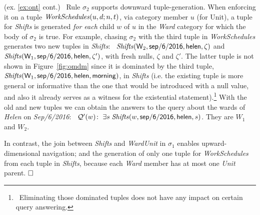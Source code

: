 \documentclass[format=acmsmall, review=false, screen=true]{acmart}
\newcommand{\ignore}[1]{}
\newcommand{\cq}{CQ}
\newcommand{\boxtheorem}{\ensuremath{\hfill \Box}}
\newcommand{\mc}[1]{\mathcal{ #1}}
\newcommand{\nit}[1]{{\it #1}}
\newcommand{\red}[1]{{#1}}
\newcommand{\blue}[1]{{#1}}
\newcommand{\comlb}[1]{{\vspace{2mm}\noindent \bf \blue{COMM(LEO):}}~ #1 \hfill {\bf
    END.}\\}
\newcommand{\commos}[1]{{\vspace{2mm}\noindent \bf \blue{COMM(MOSTAFA):}}~ #1 \hfill {\bf
    END.}\\}
\begin{document}
\begin{example} \label{ex:dn} (ex. \ref{ex:ont} cont.) \ Rule $\sigma_2$ supports downward tuple-generation. When enforcing it on a tuple ${\it WorkSchedules}(u,d;n,t)$, via category member $u$ (for Unit), a tuple for {\it Shifts} is generated {\em for each} child $w$ of $u$ in the \nit{Ward} category for which the body of $\sigma_2$ is true.
For example, chasing $\sigma_2$ with the third tuple in {\it WorkSchedules} generates two new tuples in \nit{Shifts}: \ ${\it Shifts}({\sf W}_2, {\sf sep/6/2016},{\sf helen},\zeta)$ and ${\it Shifts}({\sf W}_1, {\sf sep/6/2016},{\sf helen},\zeta')$, with fresh nulls, $\zeta$ and $\zeta'$. The latter tuple is not shown in Figure~\ref{fig:omdm} \red{since} it is dominated by the third tuple, ${\it Shifts}({\sf W}_1, {\sf sep/6/2016},{\sf helen},{\sf morning})$, in \nit{Shifts} \red{(i.e. the existing tuple is more general or informative than the one that would be introduced with a null value, and also it already serves as a witness for the existential statement).\footnote{\ \red{Eliminating those dominated tuples does not have any impact on certain query answering.}}} With the old and new tuples we can obtain the answers to the query about the wards of {\it Helen}  on \nit{Sep/6/2016}: \ $\mc{Q}'(w)\!: \ \exists s\;{\it Shifts}(w, {\sf sep/6/2016}, {\sf helen}, s)$.
 They are $W_1$ and $W_2$.



In contrast, the join between {\it Shifts} and {\it WardUnit} in $\sigma_1$ enables upward-dimensional navigation; and the generation of only one tuple for {\it WorkSchedules} from each tuple in {\it Shifts}, because each {\it Ward} member has at most one {\it Unit} parent.
\boxtheorem\end{example}

\ignore{
\commos{We assumed strictness in adjacent child-parent categories (in (\ref{frm:key})), but not in general, i.e. between ancestors and descendants. So I think if we do not consider strictness, even in upward navigation we might generate multiple tuples.

But the issue I tired to explain here also relates to the fact that we employed oblivious chase that does not check satisfaction and blindly adds atoms (e.g. ${\it Shifts}({\sf W}_1, {\sf sep/6/2016},{\sf helen},\zeta')$). However, the new atom do not change \cq \ answers because of the already existing atom (e.g. ${\it Shifts}({\sf W}_1, {\sf sep/6/2016},{\sf helen},{\sf morning})$).}  }
\end{document}
